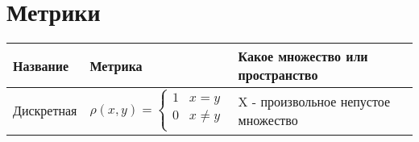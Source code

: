 

\section{Метрики}
 {\setlength{\extrarowheight}{8pt}
  \begin{tabular}{||p{2.5cm}|m{6cm}|p{7cm}||}

      \hline
      Название              & Метрика                                                                  & Какое множество или пространство                                                                                   \\
      \hline

      Дискретная            & $
          \rho (x,y) =
      \begin{cases}
              1 & x=y      \\
              0 & x \neq y \\
          \end{cases}$       & X - произвольное непустое множество

      \\
      \hline


\end{tabular}}
